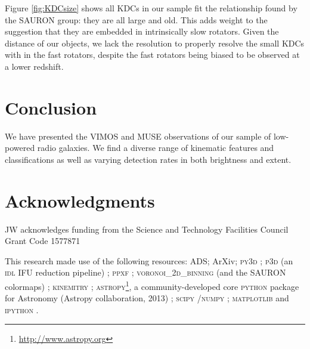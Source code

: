 \documentclass[fleqn,usenatbib,useAMS]{mnras}
\begin{document}
	Figure \ref{fig:KDCsize} shows all KDCs in our sample fit the relationship found by the SAURON group: they are all large and old. This adds weight to the suggestion that they are embedded in intrinsically slow rotators. Given the distance of our objects, we lack the resolution to properly resolve the small KDCs with in the fast rotators, despite the fast rotators being biased to be observed at a lower redshift.



\section{Conclusion}
	\label{sec:conc}
	We have presented the VIMOS and MUSE observations of our sample of low-powered radio galaxies. We find a diverse range of kinematic features and classifications as well as varying detection rates in both brightness and extent. 



\section*{Acknowledgments}
JW acknowledges funding from the Science and Technology Facilities Council Grant Code 1577871

This research made use of the following resources: ADS; ArXiv; \textsc{py3d} \citep{Sanchez2011, Husemann2013, Husemann2014}; \textsc{p3d} (an \textsc{idl} IFU reduction pipeline) \citep{Sandin2010, Sandin2011}; \textsc{ppxf} \citep{Cappellari2004}; \textsc{voronoi\_2d\_binning} (and the SAURON colormaps) \citep{Cappellari2003}; \textsc{kinemitry} \citep{Krajnovi2006}; \textsc{astropy}\footnote{\url{http://www.astropy.org}}, a community-developed core \textsc{python} package for Astronomy (Astropy collaboration, 2013) \citep{TheAstropyCollaboration2013}; \textsc{scipy} \citep{Oliphant2007, Millman2011}/\textsc{numpy} \citep{VanderWalt2011}; \textsc{matplotlib} \citep{Hunter2007} and \textsc{ipython} \citep{Perez2007}. %



{}

\appendix


\end{document}
